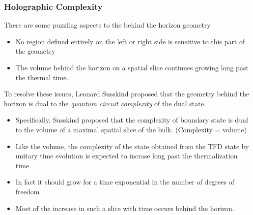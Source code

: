 \documentclass[8pt,aspectratio=169]{beamer}
\begin{document}
\begin{frame}
\frametitle{Holographic Complexity}

There are some puzzling aspects to the behind the horizon geometry

\begin{minipage}[t]{0.55\linewidth}

\begin{itemize}

\item No region defined entirely on the left or right side is sensitive to this part of the geometry

\item The volume behind the horizon on a spatial slice continues growing long past the thermal time.

\end{itemize}

To resolve these issues, Leonard Susskind proposed that the geometry behind the horizon is dual to the \textit{quantum circuit complexity} of the dual state.

\begin{itemize}

\item Specifically, Susskind proposed that the complexity of boundary state is dual to the volume of a maximal spatial slice of the bulk. (Complexity = volume)

\item Like the volume, the complexity of the state obtained from the TFD state by unitary time evolution is expected to incrase long past the thermalization time

\item In fact it should grow for a time exponential in the number of degrees of freedom

\item Most of the increase in such a slice with time occurs behind the horizon.

\end{itemize}

\end{minipage}\hfill
%
\begin{minipage}[t]{0.44\linewidth}

\begin{figure}
    \begin{center}
    

\end{center}
\end{figure}
\end{minipage}
\end{frame}
\end{document}
